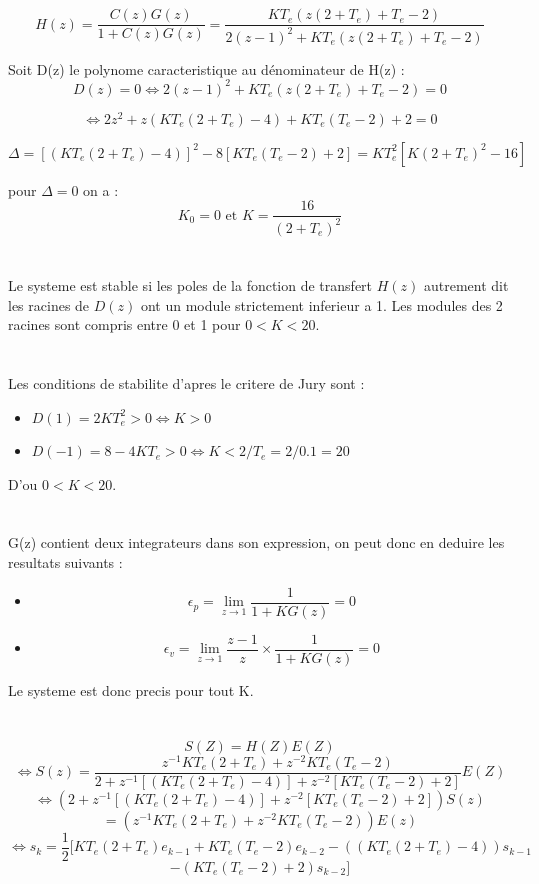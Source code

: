 \documentclass[14pt]{extarticle}
\begin{document}
\section{}
\[H(z) = \frac{C(z)G(z)}{1+C(z)G(z)} = \frac{KT_e(z(2+T_e) + T_e - 2)}{2(z-1)^2 + KT_e(z(2+T_e)+T_e - 2)}\] 

Soit D(z) le polynome caracteristique au dénominateur de H(z) :
\[D(z) = 0 \Leftrightarrow 2(z-1)^2 + KT_e(z(2+T_e)+T_e - 2) = 0 \]

\[\Leftrightarrow 2z^2 + z(KT_e(2+T_e) - 4) + KT_e(T_e - 2) +2 = 0 \]

\[\Delta = [(KT_e(2 + T_e)-4)]^2 - 8[KT_e(T_e -2) +2] = KT_e^2[K(2+T_e)^2 - 16] \]

pour $\Delta = 0$ on a : 
\[K_0 = 0 \text{ et } K = \frac{16}{(2+T_e)^2}\]
\section{}
Le systeme est stable si les poles de la fonction de transfert $H(z)$ autrement dit les racines de $D(z)$ ont un module strictement inferieur a 1.
\break
Les modules des 2 racines sont compris entre 0 et 1 pour $0<K<20$.
\section{}
Les conditions de stabilite d'apres le critere de Jury sont :
\begin{itemize}
    \item $D(1) = 2KT_e^2 > 0 \Leftrightarrow K > 0$
    \item $D(-1) = 8-4KT_e>0 \Leftrightarrow K<2/T_e = 2/0.1 = 20$
\end{itemize}
D'ou $0<K<20$.

\section{}
G(z) contient deux integrateurs dans son expression, on peut donc en deduire les resultats suivants :
\begin{itemize}
    \item \[\epsilon_p = \lim_{z\to1} \frac{1}{1+KG(z)} = 0\]
    \item \[\epsilon_v = \lim_{z\to1} \frac{z-1}{z} \times \frac{1}{1+KG(z)} = 0\]
\end{itemize}
Le systeme est donc precis pour tout K.

\section{}
\[{S(Z)} = H(Z)E(Z) \]
\[\Leftrightarrow S(z) = \frac{z^{-1}KT_e(2+T_e) + z^{-2}KT_e(T_e-2) }{2+z^{-1}[(KT_e(2+T_e) - 4)] + z^{-2} [KT_e(T_e-2) +2]} E(Z)\]
\[\Leftrightarrow (2+z^{-1}[(KT_e(2+T_e) - 4)] + z^{-2} [KT_e(T_e-2) +2])S(z)\]  \[= (z^{-1}KT_e(2+T_e) + z^{-2}KT_e(T_e-2))E(z)\] 
\[\Leftrightarrow s_k = \frac{1}{2} [KT_e(2+T_e)e_{k-1} + KT_e(T_e - 2)e_{k-2} - ((KT_e(2+T_e)-4))s_{k-1} \] \[ - (KT_e(T_e-2)+2)s_{k-2}]\]
\end{document}
